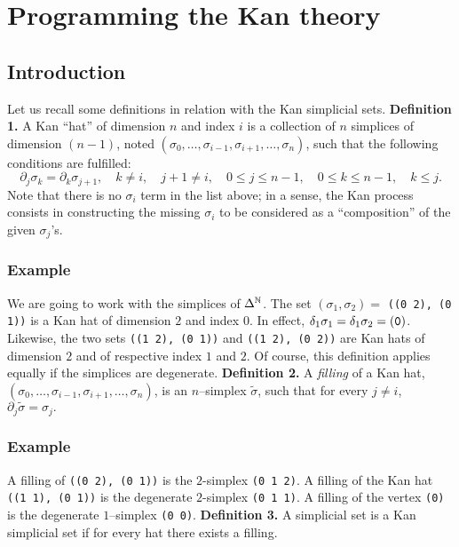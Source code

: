 \chapter {Programming the Kan theory}

\section {Introduction}

Let us recall some definitions in relation with the Kan simplicial sets.
\vskip 0.40cm
{\bf Definition 1.} A Kan ``hat'' of dimension $n$ and index $i$ is a collection
of $n$ simplices of dimension  $(n-1)$, noted 
$(\sigma_0, \ldots, \sigma_{i-1}, \sigma_{i+1}, \ldots, \sigma_n)$,
such that the following conditions are fulfilled:
$$ \partial_j\sigma_k=\partial_k\sigma_{j+1},\quad k \not= i,\quad j+1 \not= i, \quad 0 \leq j \leq n-1, \quad
  0 \leq k \leq n-1, \quad k \leq j. $$
Note that there is no $\sigma_i$ term in the list above; in a sense, the Kan process consists in
constructing the missing $\sigma_i$ to be considered as a ``composition'' of the given $\sigma_j$'s.
\subsection* {Example}

We are going to work with the simplices of $\Delta^{{\Bbb N}}$. The set $(\sigma_1, \sigma_2) = $ {\tt ((0 2), (0 1))}
is a Kan hat of dimension $2$ and index $0$. In effect, $\delta_1\sigma_1=\delta_1\sigma_2 = {\tt (0)}$. 
Likewise, the two sets {\tt ((1 2), (0 1))} and {\tt ((1 2), (0 2))} are  Kan hats  of dimension $2$ and
of respective index $1$ and $2$. Of course, this definition applies equally if the simplices
are degenerate.
\vskip 0.40cm
{\bf Definition 2.} A {\em filling} of a Kan hat,
$(\sigma_0, \ldots, \sigma_{i-1}, \sigma_{i+1}, \ldots, \sigma_n)$,
is an $n$--simplex $\tilde{\sigma}$, 
such that for every $j \not= i$, $\partial_j\tilde{\sigma}=\sigma_j.$

\subsection* {Example}

A filling of {\tt ((0 2), (0 1))} is the $2$-simplex {\tt (0 1 2)}. A filling of the Kan hat
{\tt ((1 1), (0 1))} is the degenerate $2$-simplex {\tt (0 1 1)}. A filling
of the vertex {\tt (0)} is the degenerate $1$--simplex {\tt (0 0)}.
\vskip 0.40cm
{\bf Definition 3.} A simplicial set is a Kan simplicial set if for every hat there exists a filling.

